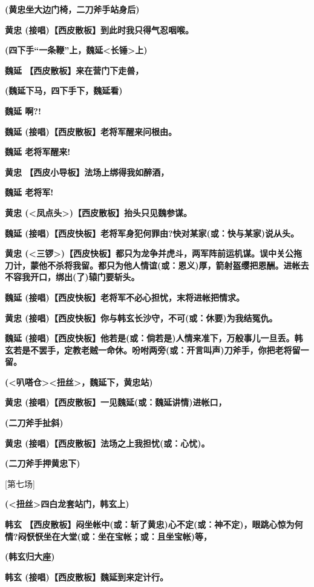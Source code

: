 \textbf{(黄忠坐大边门椅，二刀斧手站身后)}

\textbf{黄忠 (接唱)【西皮散板】到此时我只得气忍咽喉。}

\textbf{(四下手``一条鞭''上，魏延\textless{}长锤\textgreater{}上)}

\textbf{魏延 【西皮散板】来在营门下走兽，}

\textbf{(魏延下马，四下手下，魏延看)}

\textbf{魏延 啊?!}

\textbf{魏延 (接唱)【西皮散板】老将军醒来问根由。}

\textbf{魏延 老将军醒来!}

\textbf{黄忠 【西皮小导板】法场上绑得我如醉酒，}

\textbf{魏延 老将军!}

\textbf{黄忠
(\textless{}凤点头\textgreater{})【西皮散板】抬头只见魏参谋。}

\textbf{魏延
(接唱)【西皮快板】老将军身犯何罪由?快对某家(或：快与某家)说从头。}

\textbf{黄忠
(\textless{}三锣\textgreater{})【西皮快板】都只为龙争并虎斗，两军阵前运机谋。误中关公拖刀计，蒙他不杀将我留。都只为他人情谊(或：恩义)厚，箭射盔缨把恩酬。进帐去不容我开口，绑出(了)辕门要斩头。}

\textbf{魏延 (接唱)【西皮快板】老将军不必心担忧，末将进帐把情求。}

\textbf{黄忠
(接唱)【西皮快板】你与韩玄长沙守，不可(或：休要)为我结冤仇。}

\textbf{魏延
(接唱)【西皮快板】他若是(或：倘若是)人情来准下，万般事儿一旦丢。韩玄若是不罢手，定教老贼一命休。吩咐两旁(或：开言叫声)刀斧手，你把老将留一留。}

\textbf{(\textless{}叭嗒仓\textgreater{}\textless{}扭丝\textgreater{}，魏延下，黄忠站)}

\textbf{黄忠 (接唱)【西皮散板】一见魏延(或：魏延讲情)进帐口，}

\textbf{(二刀斧手扯斜)}

\textbf{黄忠 (接唱)【西皮散板】法场之上我担忧(或：心忧)。}

\textbf{(二刀斧手押黄忠下)}

{[}第七场{]}

\textbf{(\textless{}扭丝\textgreater{}四白龙套站门，韩玄上)}

\textbf{韩玄
【西皮散板】闷坐帐中(或：斩了黄忠)心不定(或：神不定)，眼跳心惊为何情?闷恹恹坐在大堂(或：坐在宝帐；或：且坐宝帐)等，}

\textbf{(韩玄归大座)}

\textbf{韩玄 (接唱)【西皮散板】魏延到来定计行。}

